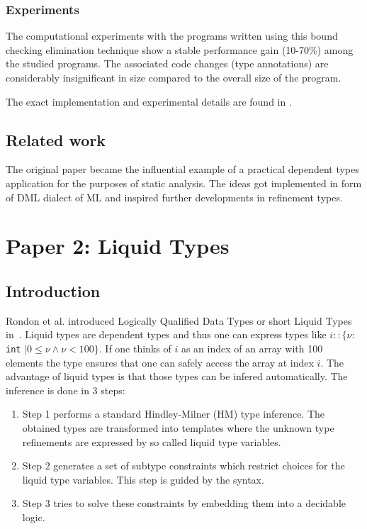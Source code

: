 \documentclass[a4paper,UKenglish]{lipics-v2016}
\begin{document}
\subsubsection{Experiments}

The computational experiments with the programs written using this bound
checking elimination technique show a stable performance gain (10-70\%) among
the studied programs. The associated code changes (type annotations) are
considerably insignificant in size compared to the overall size of the program.

The exact implementation and experimental details are found in \cite{Xi:1998}.

\subsection{Related work}

The original paper became the influential example of a practical dependent
types application for the purposes of static analysis. The ideas got
implemented in form of DML dialect of ML \cite{XiPhd:1998} and inspired further
developments in refinement types.



\section{Paper 2: Liquid Types}

\subsection{Introduction}

Rondon et al. introduced Logically Qualified Data Types or short Liquid Types in~\cite{Rondon:2008:LT}.
Liquid types are dependent types and thus one can express types like $i:: \{\nu:$ \lstinline{int} $\mid 0 \le \nu \land \nu < 100\}$.
If one thinks of $i$ as an index of an array with 100 elements the type ensures that one can safely access the array at index $i$.
The advantage of liquid types is that those types can be infered automatically.
The inference is done in 3 steps:
\begin{enumerate}
    \item Step 1 performs a standard Hindley-Milner (HM) type inference.
        The obtained types are transformed into templates where the unknown type refinements are expressed by so called liquid type variables.
    \item Step 2 generates a set of subtype constraints which restrict choices for the liquid type variables.
        This step is guided by the syntax.
    \item Step 3 tries to solve these constraints by embedding them into a decidable logic.
\end{enumerate}
\end{document}
